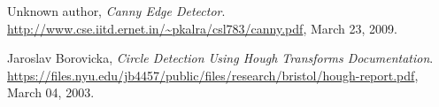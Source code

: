 \begin{thebibliography}{9}

  Unknown author,
  \emph{Canny Edge Detector}.
  \url{http://www.cse.iitd.ernet.in/~pkalra/csl783/canny.pdf},
  March 23, 2009.

  Jaroslav Borovicka,
  \emph{Circle Detection Using Hough Transforms Documentation}.
  \url{https://files.nyu.edu/jb4457/public/files/research/bristol/hough-report.pdf},
  March 04, 2003.


\end{thebibliography}